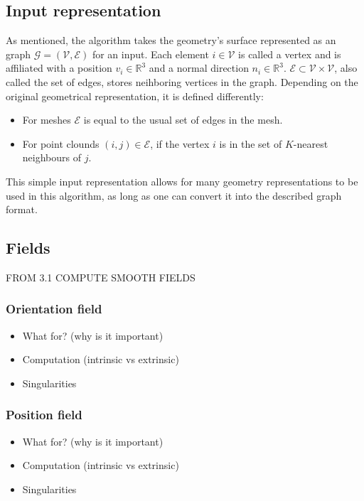 \documentclass{ACGSeminar}
\begin{document}
\subsection{Input representation}
As mentioned, the algorithm takes the geometry's surface represented as an graph $\mathcal{G} = (\mathcal{V}, \mathcal{E})$ for an input. Each element $i \in \mathcal{V}$ is called a vertex and is affiliated with a position $v_i \in \mathbb{R}^3$ and a normal direction $n_i \in \mathbb{R}^3$. $\mathcal{E} \subset \mathcal{V} \times \mathcal{V}$, also called the set of edges, stores neihboring vertices in the graph. Depending on the original geometrical representation, it is defined differently:
\begin{itemize}
	\item	For meshes $\mathcal{E}$ is equal to the usual set of edges in the mesh.
	\item	For point clounds $(i,j) \in \mathcal{E}$, if the vertex $i$ is in the set of $K$-nearest neighbours of $j$.
\end{itemize}

This simple input representation allows for many geometry representations to be used in this algorithm, as long as one can convert it into the described graph format.

\subsection{Fields}
FROM 3.1 COMPUTE SMOOTH FIELDS

\subsubsection{Orientation field}
\begin{itemize}
	\item	What for? (why is it important)
	\item	Computation (intrinsic vs extrinsic)
	\item	Singularities
\end{itemize}

\subsubsection{Position field}
\begin{itemize}
	\item	What for? (why is it important)
	\item	Computation (intrinsic vs extrinsic)
	\item	Singularities
\end{itemize}
\end{document}
